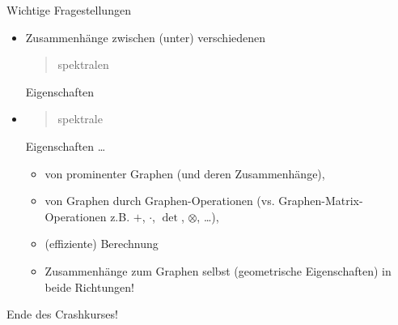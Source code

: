 \documentclass[aspectratio=169]{beamer}
\begin{document}
\begin{frame}{Wichtige Fragestellungen}

    \begin{block}{}

        \begin{itemize}

            \item Zusammenhänge zwischen (unter) verschiedenen \blockquote{spektralen} Eigenschaften

            \item \blockquote{spektrale} Eigenschaften \dots

            \begin{itemize}
                \item von prominenter Graphen (und deren Zusammenhänge),
                \item von Graphen durch Graphen-Operationen (vs. Graphen-Matrix-Operationen z.B. $+$, $\cdot$, $\det$, $\otimes$, \dots),
                \item (effiziente) Berechnung
                \item Zusammenhänge zum Graphen selbst (geometrische Eigenschaften) in beide Richtungen!
            \end{itemize}

        \end{itemize}

    \end{block}

\end{frame}

\begin{frame}{}

    \begin{block}{}

        {
            \centering
            \huge
            Ende des Crashkurses!
        }

    \end{block}

\end{frame}

\appendix
\end{document}
